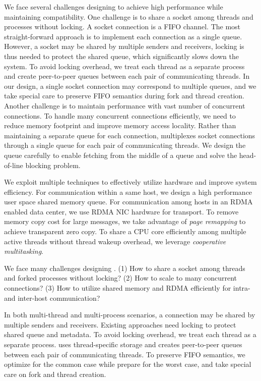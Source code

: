 We face several challenges designing \sys{} to achieve high performance while maintaining compatibility. 
One challenge is to share a socket among threads and processes without locking. A socket connection is a FIFO channel. 
The most straight-forward approach is to implement each connection as a single queue. However, a socket may be shared by multiple 
senders and receivers, locking is thus needed to protect the shared queue, which significantly slows down the system. To avoid locking overhead, we treat each thread as a separate process and create peer-to-peer queues between each pair of 
communicating threads. In our design, a single socket connection may correspond to multiple queues, and we take special care to preserve
FIFO semantics during fork and thread creation. Another challenge is to maintain performance with vast number of concurrent connections. 
To handle many concurrent connections efficiently, we need to reduce memory footprint and improve memory access locality. 
Rather than maintaining a separate queue for each connection, \sys multiplexes socket connections through a single queue for each pair of communicating threads.
We design the queue carefully to enable fetching from the middle of a queue and solve the head-of-line blocking problem. 

We exploit multiple techniques to effectively utilize hardware and improve system efficiency. 
For communication within a same host, we design a high performance user space shared memory queue.
For communication among hosts in an RDMA enabled data center, we use RDMA NIC hardware for transport. 
To remove memory copy cost for large messages, we take advantage of \emph{page remapping} to achieve transparent zero copy.
To share a CPU core efficiently among multiple active threads without thread wakeup overhead, we leverage \emph{cooperative multitasking}. 

\iffalse

We face many challenges designing \sys{}. 
(1) How to share a socket among threads and forked processes without locking?
(2) How to scale to many concurrent connections?
(3) How to utilize shared memory and RDMA efficiently for intra- and inter-host communication?

In both multi-thread and multi-process scenarios, a connection may be shared by multiple senders and receivers.
Existing approaches need locking to protect shared queue and metadata.
To avoid locking overhead, we treat each thread as a separate process.
\libipc{} uses thread-specific storage and creates peer-to-peer queues between each pair of communicating threads.
To preserve FIFO semantics, we optimize for the common case while prepare for the worst case, and take special care on fork and thread creation.


